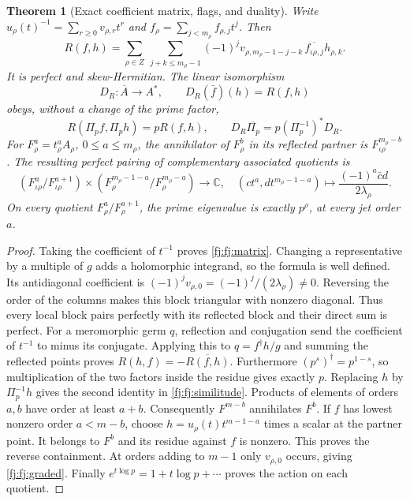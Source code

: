 \documentclass[11pt,a4paper]{article}
\newtheorem{theorem}{Theorem}[section]
\theoremstyle{definition}\newtheorem{definition}[theorem]{Definition}
\newcommand{\C}{\mathbb C}\newcommand{\R}{\mathbb R}
\begin{document}
\begin{theorem}[Exact coefficient matrix, flags, and duality]
\label{fj:thm:perfect}
Write $u_\rho(t)^{-1}=\sum_{r\ge0}v_{\rho,r}t^r$ and
$f_\rho=\sum_{j<m_\rho}f_{\rho,j}t^j$. Then
\[
 R(f,h)=\sum_{\rho\in Z}\ \sum_{j+k\le m_\rho-1}
 (-1)^jv_{\rho,m_\rho-1-j-k}\,
 \overline{f_{\iota\rho,j}}h_{\rho,k}.
 \tag{FJ4}\label{fj:fj:matrix}
\]
It is perfect and skew-Hermitian. The linear isomorphism
\[
 D_R:\overline A\longrightarrow A^*,\qquad
 D_R(\bar f)(h)=R(f,h)
 \tag{FJ5}\label{fj:fj:dual}
\]
obeys, without a change of the prime factor,
\[
 R(\Pi_p f,\Pi_p h)=pR(f,h),\qquad
 D_R\overline{\Pi_p}=p(\Pi_p^{-1})^*D_R.
 \tag{FJ6}\label{fj:fj:similitude}
\]
For $F^a_\rho=t_\rho^aA_\rho$, $0\le a\le m_\rho$, the annihilator
of $F^b_\rho$ in its reflected partner is $F^{m_\rho-b}_{\iota\rho}$.
The resulting perfect pairing of complementary associated quotients is
\[
 (F^a_{\iota\rho}/F^{a+1}_{\iota\rho})\times
 (F^{m_\rho-1-a}_\rho/F^{m_\rho-a}_\rho)\longrightarrow\C,
 \quad (ct^a,dt^{m_\rho-1-a})\longmapsto
       \frac{(-1)^a\bar c d}{2\lambda_\rho}.
 \tag{FJ7}\label{fj:fj:graded}
\]
On every quotient $F^a_\rho/F^{a+1}_\rho$, the prime eigenvalue is
exactly $p^\rho$, at every jet order $a$.
\end{theorem}
\begin{proof}
Taking the coefficient of $t^{-1}$ proves \eqref{fj:fj:matrix}.
Changing a representative by a multiple of $g$ adds a holomorphic
integrand, so the formula is well defined. Its antidiagonal coefficient
is $(-1)^jv_{\rho,0}=(-1)^j/(2\lambda_\rho)\ne0$.
Reversing the order of the columns makes this block triangular with
nonzero diagonal. Thus every local block pairs perfectly with its
reflected block and their direct sum is perfect.
For a meromorphic germ $q$, reflection and conjugation send the
coefficient of $t^{-1}$ to minus its conjugate. Applying this to
$q=f^\dagger h/g$ and summing the reflected points proves
$R(h,f)=-\overline{R(f,h)}$.
Furthermore $(p^s)^\dagger=p^{1-s}$, so multiplication of the two
factors inside the residue gives exactly $p$. Replacing $h$ by
$\Pi_p^{-1}h$ gives the second identity in \eqref{fj:fj:similitude}.
Products of elements of orders $a,b$ have order at least $a+b$.
Consequently $F^{m-b}$ annihilates $F^b$. If $f$ has lowest nonzero
order $a<m-b$, choose $h=u_\rho(t)t^{m-1-a}$ times a scalar at the
partner point. It belongs to $F^b$ and its residue against $f$ is
nonzero. This proves the reverse containment. At orders adding to
$m-1$ only $v_{\rho,0}$ occurs, giving \eqref{fj:fj:graded}.
Finally $e^{t\log p}=1+t\log p+\cdots$ proves the action on each quotient.
\end{proof}
\end{document}
